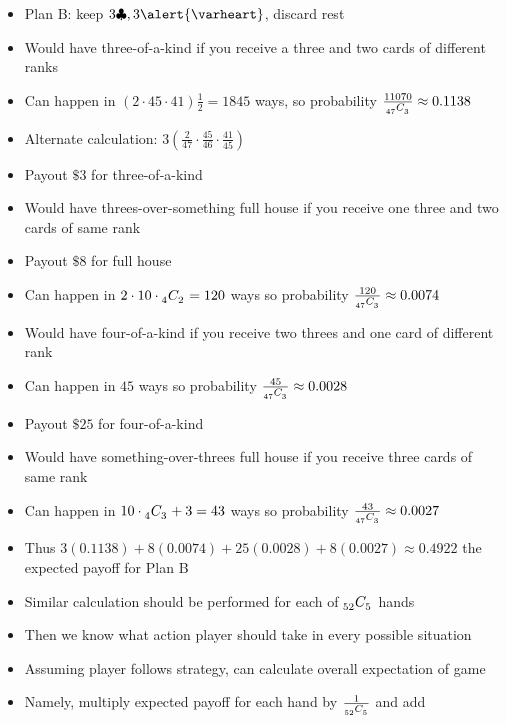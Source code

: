 \documentclass[xcolor=dvipsnames]{beamer}
\theoremstyle{definition}
\newcommand\ncr[2]{\tensor[_{#1}]C{_{#2}}}
\newcommand{\hs}{\alert{\varheart}}
\newcommand{\cs}{\clubsuit}
\begin{document}
\begin{frame}
\begin{itemize}
\item Plan B: keep $3\cs,3\hs$, discard rest
\item Would have three-of-a-kind if you receive
a three and two cards of different ranks
\item Can happen in $\left(2\cdot 45\cdot 41\right)\frac{1}{2}
=1845$ ways,
so probability $\frac{11070}{\ncr{47}{3}}\approx 0.1138$
\item Alternate calculation:
$3\left(\frac{2}{47}\cdot\frac{45}{46}
\cdot\frac{41}{45}\right)$
\item Payout $\$3$ for three-of-a-kind
\item Would have threes-over-something full house if
you receive one three and two cards of same rank
\item Payout $\$8$ for full house
\item Can happen in $2\cdot 10\cdot\ncr{4}{2}=120$ ways
so probability $\frac{120}{\ncr{47}{3}}\approx 0.0074$
\end{itemize}
\end{frame}

\begin{frame}
\begin{itemize}
\item Would have four-of-a-kind if you receive
two threes and one card of different rank
\item Can happen in $45$ ways
so probability $\frac{45}{\ncr{47}{3}}\approx 0.0028$
\item Payout $\$25$ for four-of-a-kind
\item Would have something-over-threes full house
if you receive three cards of same rank
\item Can happen in $10\cdot\ncr{4}{3}+3=43$ ways
so probability $\frac{43}{\ncr{47}{3}}\approx 0.0027$
\item Thus $3\left(0.1138\right)+8\left(0.0074\right)
+25\left(0.0028\right)+8\left(0.0027\right)
\approx 0.4922$ the expected payoff for Plan B
\end{itemize}
\end{frame}


\begin{frame}
\begin{itemize}
\item Similar calculation should be performed for each
of $\ncr{52}{5}$ hands
\item Then we know what action player should take in
every possible situation
\item Assuming player follows strategy, can calculate
overall expectation of game
\item Namely, multiply expected payoff for each hand by
$\frac{1}{\ncr{52}{5}}$ and add
\end{itemize}
\end{frame}
\end{document}
